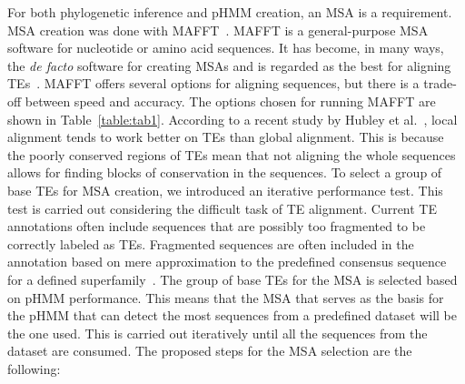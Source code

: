\documentclass[unnumsec,webpdf,contemporary,large]{oup-authoring-template}%
\theoremstyle{thmstyleone}%
\theoremstyle{thmstyletwo}%
\theoremstyle{thmstylethree}%
\begin{document}
For both phylogenetic inference and pHMM creation, an MSA is a requirement. MSA
creation was done with MAFFT~\cite{katoh_mafft_2013}. MAFFT is a general-purpose
MSA software for nucleotide or amino acid sequences. It has become, in many
ways, the \textit{de facto} software for creating MSAs and is regarded as the
best for aligning TEs~\cite{hubley_accuracy_2022}. MAFFT offers several options
for aligning sequences, but there is a trade-off between speed and accuracy. The
options chosen for running MAFFT are shown in Table~\ref{table:tab1}. According
to a recent study by Hubley et al.~\cite{hubley_accuracy_2022}, local alignment
tends to work better on TEs than global alignment. This is because the poorly
conserved regions of TEs mean that not aligning the whole sequences allows for
finding blocks of conservation in the sequences. To select a group of base TEs
for MSA creation, we introduced an iterative performance test. This test is
carried out considering the difficult task of TE alignment. Current TE
annotations often include sequences that are possibly too fragmented to be
correctly labeled as TEs. Fragmented sequences are often included in the
annotation based on mere approximation to the predefined consensus sequence for
a defined superfamily~\cite{wells_field_2020, branco_overview_2023}. The group
of base TEs for the MSA is selected based on pHMM performance. This means that
the MSA that serves as the basis for the pHMM that can detect the most sequences
from a predefined dataset will be the one used. This is carried out iteratively
until all the sequences from the dataset are consumed. The proposed steps for
the MSA selection are the following:
\end{document}
